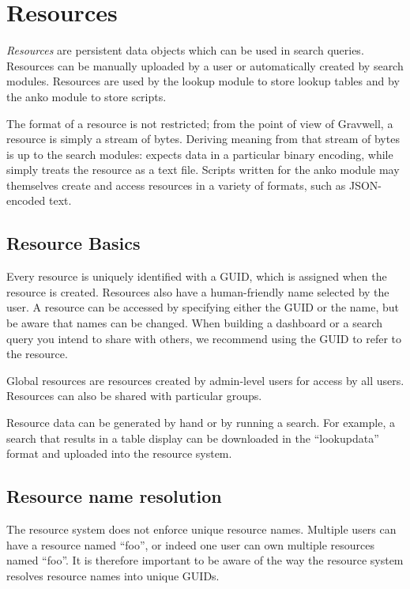 \section{Resources}
\label{sec:resources}

\emph{Resources} are persistent data objects which can be used in search
queries. Resources can be manually uploaded by a user or automatically
created by search modules. Resources are used by the lookup module to
store lookup tables and by the anko module to store scripts.

The format of a resource is not restricted; from the point of view of
Gravwell, a resource is simply a stream of bytes. Deriving meaning from
that stream of bytes is up to the search modules:  expects data in
a particular binary encoding, while  simply treats the resource as a
text file. Scripts written for the anko module may themselves create and
access resources in a variety of formats, such as JSON-encoded text.

\subsection{Resource Basics}

Every resource is uniquely identified with a GUID, which is assigned
when the resource is created. Resources also have a human-friendly name
selected by the user. A resource can be accessed by specifying either
the GUID or the name, but be aware that names can be changed. When
building a dashboard or a search query you intend to share with others,
we recommend using the GUID to refer to the resource.

Global resources are resources created by admin-level users for access
by all users. Resources can also be shared with particular groups.

Resource data can be generated by hand or by running a search. For
example, a search that results in a table display can be downloaded in
the ``lookupdata'' format and uploaded into the resource system.

\subsection{Resource name resolution}

The resource system does not enforce unique resource names. Multiple
users can have a resource named ``foo'', or indeed one user can own
multiple resources named ``foo''. It is therefore important to be aware of
the way the resource system resolves resource names into unique GUIDs.

